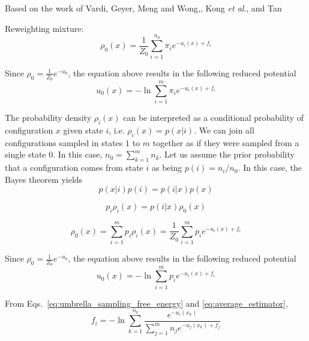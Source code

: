 \documentclass[aip,jcp,preprint,amsmath,amssymb]{revtex4-1}
\begin{document}
Based on the work of Vardi,\cite{Vardi_1985} Geyer,\cite{Geyer_1994} Meng and Wong,\cite{Meng_1996}, Kong \textit{et al}.\cite{Kong_2003}, and Tan\cite{Tan_2004}

Reweighting mixture\cite{Geyer_1994}:
\begin{equation*}
\rho_0(x) = \frac{1}{Z_0} \sum_{i=1}^{n_0} \pi_i e^{-u_i(x) + f_i}
\end{equation*}

Since $\rho_0 = \frac{1}{Z_0} e^{-u_0}$, the equation above results in the following reduced potential
\begin{equation}
\label{eq:mbar_reduced_potential}
u_0(x) = -\ln \sum_{i=1}^m \pi_i e^{-u_i(x) + f_i}
\end{equation}





The probability density $\rho_i(x)$ can be interpreted as a conditional probability of configuration $x$ given state $i$, i.e. $\rho_i(x) = p(x|i)$. We can join all configurations sampled in states $1$ to $m$ together as if they were sampled from a single state $0$. In this case, $n_0 = \sum_{k=1}^m n_k$. Let us assume the prior probability that a configuration comes from state $i$ as being $p(i) = n_i/n_0$. In this case, the Bayes theorem yields
\begin{equation*}
p(x|i) p(i) = p(i|x) p(x)
\end{equation*}

\begin{equation*}
p_i \rho_i(x) = p(i|x) \rho_0(x)
\end{equation*}

\begin{equation}
\label{eq:mbar_probability_density}
\rho_0(x) = \sum_{i=1}^m p_i \rho_i(x) = \frac{1}{Z_0} \sum_{i=1}^m p_i e^{-u_i(x) + f_i}
\end{equation}

Since $\rho_0 = \frac{1}{Z_0} e^{-u_0}$, the equation above results in the following reduced potential
\begin{equation}
\label{eq:mbar_reduced_potential}
u_0(x) = -\ln \sum_{i=1}^m p_i e^{-u_i(x) + f_i}
\end{equation}

From Eqs.~\eqref{eq:umbrella_sampling_free_energy} and \eqref{eq:average_estimator},
\begin{equation*}
f_i = -\ln \sum_{k=1}^{n_0} \frac{e^{-u_i(x_k)}}{\sum_{j=1}^m n_j e^{-u_j(x_k) + f_j}}
\end{equation*}
\end{document}
